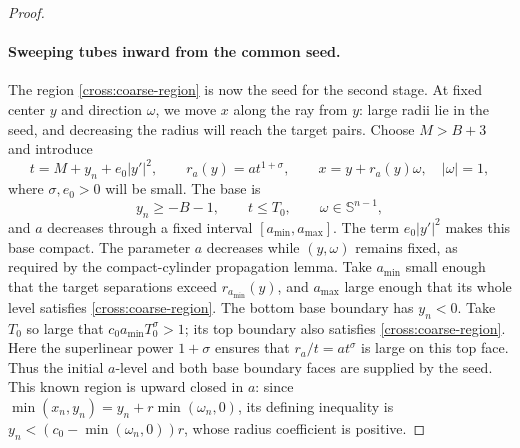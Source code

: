 \begin{proof}
\paragraph{Sweeping tubes inward from the common seed.}
The region \eqref{cross:coarse-region} is now the seed for the second
stage. At fixed center $y$ and direction $\omega$, we move $x$ along the
ray from $y$: large radii lie in the seed, and decreasing the radius
will reach the target pairs. Choose $M>B+3$ and introduce
\begin{equation}\label{cross:tubes}
 t=M+y_n+e_0|y'|^2,\qquad r_a(y)=a t^{1+\sigma},\qquad
 x=y+r_a(y)\omega,\quad |\omega|=1,
\end{equation}
where $\sigma,e_0>0$ will be small.  The base is
\[
 y_n\ge-B-1,\qquad t\le T_0,\qquad \omega\in\mathbb S^{n-1},
\]
and $a$ decreases through a fixed interval $[a_{\min},a_{\max}]$.
The term $e_0|y'|^2$ makes this base compact. The parameter $a$ decreases
while $(y,\omega)$ remains fixed, as required by the compact-cylinder
propagation lemma.
Take $a_{\min}$ small enough that the target separations exceed
$r_{a_{\min}}(y)$, and $a_{\max}$ large enough that its whole level
satisfies \eqref{cross:coarse-region}.  The bottom base boundary has
$y_n<0$.  Take $T_0$ so large that
$c_0a_{\min}T_0^\sigma>1$; its top boundary also satisfies
\eqref{cross:coarse-region}. Here the superlinear power $1+\sigma$
ensures that $r_a/t=a t^\sigma$ is large on this top face. Thus the
initial $a$-level and both base boundary faces are supplied by the seed.
This known region is upward closed in $a$: since
$\min(x_n,y_n)=y_n+r\min(\omega_n,0)$, its defining
inequality is $y_n<(c_0-\min(\omega_n,0))r$, whose radius coefficient
is positive.


\end{proof}
